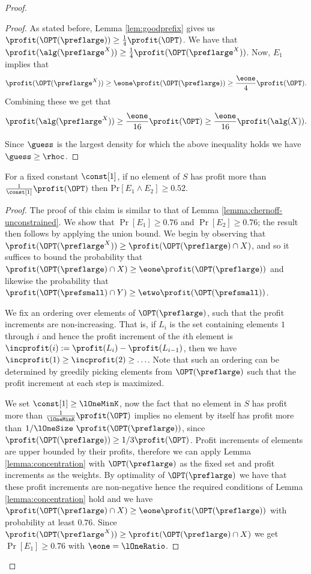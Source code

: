 \begin{proof}
\begin{proof}

As stated before, Lemma \ref{lem:goodprefix} gives us
$\profit(\OPT(\preflarge)) \geq \frac{1}{4}\profit(\OPT)$. We have
that $\profit(\alg(\preflarge^X)) \geq \frac{1}{4}
\profit(\OPT(\preflarge^X))$. Now, $E_1$ implies that
  \[\profit(\OPT(\preflarge^X)) 
  \geq \eone \profit(\OPT(\preflarge)) \geq \frac{\eone}{4}
  \profit(\OPT).\] Combining these we get that
  \[\profit(\alg(\preflarge^X)) \geq \frac{\eone}{16} \profit(\OPT) \geq
  \frac{\eone}{16} \profit(\alg(X)).\]

  Since $\guess$ is the largest density for which the above inequality
  holds we have $\guess \geq \rhoc$.
\end{proof}



\begin{claim}
\label{lem:chernoff-matroid}
For a fixed constant $\const[1]$, if no element of $S$ has profit more
than $\frac{1}{\const[1]} \profit( \OPT) $ then $\textrm{Pr}[E_1
  \wedge E_2] \geq 0.52$.
\end{claim}
\begin{proof}
The proof of this claim is similar to that of Lemma
\ref{lemma:chernoff-unconstrained}. We show that $\Pr[E_1 ] \ge 0.76
$ and $\Pr[ E_2] \ge 0.76$; the result then follows by applying the
union bound.  We begin by observing that
$\profit(\OPT(\preflarge^X)) \geq \profit(\OPT(\preflarge) \cap X)$,
and so it suffices to bound the probability that
$\profit(\OPT(\preflarge) \cap X) \geq \eone
\profit(\OPT(\preflarge))$ and likewise the probability that $\profit(\OPT(\prefsmall)
\cap Y) \geq \etwo \profit(\OPT(\prefsmall))$.



We fix an ordering over elements of $\OPT(\preflarge)$, such that the
profit increments are non-increasing. That is, if $L_i$ is the set
containing elements $1$ through $i$ and hence the profit increment of
the $i$th element is $\incprofit(i) := \profit(L_i) -
\profit(L_{i-1})$, then we have $\incprofit(1) \geq \incprofit(2) \geq
\ldots$. Note that such an ordering can be determined by greedily
picking elements from $\OPT(\preflarge)$ such that the profit
increment at each step is maximized.

We set $\const[1] \geq \lOneMinK$, now the fact that no element in $S$ has
profit more than $\frac{1}{\lOneMinK} \profit( \OPT) $ implies no element by
itself has profit more than $1/\lOneSize \ \profit(\OPT(\preflarge))$, since
$ \profit(\OPT(\preflarge)) \geq 1/3 \profit(\OPT)$. Profit increments
of elements are upper bounded by their profits, therefore we can apply
Lemma \ref{lemma:concentration} with $\OPT(\preflarge)$ as the fixed
set and profit increments as the weights. By optimality of
$\OPT(\preflarge)$ we have that these profit increments are
non-negative hence the required conditions of Lemma
\ref{lemma:concentration} hold and we have $ \profit(\OPT(\preflarge)
\cap X) \geq \eone \profit( \OPT(\preflarge)) $ with probability at
least $0.76$.  Since $\profit(\OPT(\preflarge^X)) \geq
\profit(\OPT(\preflarge) \cap X)$ we get $\Pr[ E_1 ] \ge 0.76$ with
$\eone = \lOneRatio$.


\end{proof}
\end{proof}
